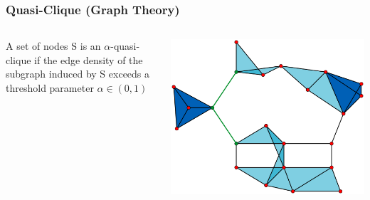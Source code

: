 \begin{frame}
\frametitle{Quasi-Clique (Graph Theory)}
\begin{columns}

A set of nodes S is an $\alpha$-quasi-clique if the edge density of the subgraph induced by S exceeds a threshold parameter $\alpha \in (0, 1)$

\includegraphics[width=1\linewidth]{img/quasi-clique}


\end{columns}
\end{frame}
